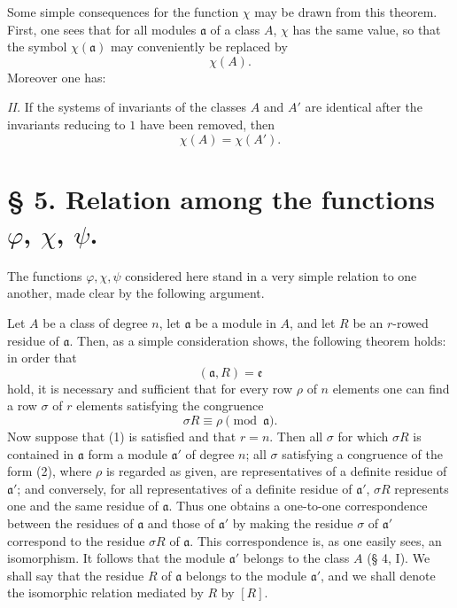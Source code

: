 \documentclass[11pt,a4paper]{article}
\begin{document}
Some simple consequences for the function $\chi$ may be drawn from this theorem. First, one sees that for all modules $\mathfrak a$ of a class $A$, $\chi$ has the same value, so that the symbol $\chi(\mathfrak a)$ may conveniently be replaced by
\[
 \chi(A).
\]
Moreover one has:

\emph{II.} If the systems of invariants of the classes $A$ and $A'$ are identical after the invariants reducing to $1$ have been removed, then
\[
 \chi(A)=\chi(A').
\]

\section*{§ 5. Relation among the functions $\varphi$, $\chi$, $\psi$.}

The functions $\varphi,\chi,\psi$ considered here stand in a very simple relation to one another, made clear by the following argument.

Let $A$ be a class of degree $n$, let $\mathfrak a$ be a module in $A$, and let $R$ be an $r$-rowed residue of $\mathfrak a$. Then, as a simple consideration shows, the following theorem holds: in order that
\begin{equation}
 (\mathfrak a,R)=\mathfrak e
\tag{1}
\end{equation}
hold, it is necessary and sufficient that for every row $\rho$ of $n$ elements one can find a row $\sigma$ of $r$ elements satisfying the congruence
\begin{equation}
 \sigma R\equiv\rho\pmod{\mathfrak a}.
\tag{2}
\end{equation}
Now suppose that (1) is satisfied and that $r=n$. Then all $\sigma$ for which $\sigma R$ is contained in $\mathfrak a$ form a module $\mathfrak a'$ of degree $n$; all $\sigma$ satisfying a congruence of the form (2), where $\rho$ is regarded as given, are representatives of a definite residue of $\mathfrak a'$; and conversely, for all representatives of a definite residue of $\mathfrak a'$, $\sigma R$ represents one and the same residue of $\mathfrak a$. Thus one obtains a one-to-one correspondence between the residues of $\mathfrak a$ and those of $\mathfrak a'$ by making the residue $\sigma$ of $\mathfrak a'$ correspond to the residue $\sigma R$ of $\mathfrak a$. This correspondence is, as one easily sees, an isomorphism. It follows that the module $\mathfrak a'$ belongs to the class $A$ (§ 4, I). We shall say that the residue $R$ of $\mathfrak a$ belongs to the module $\mathfrak a'$, and we shall denote the isomorphic relation mediated by $R$ by $[R]$.
\end{document}
